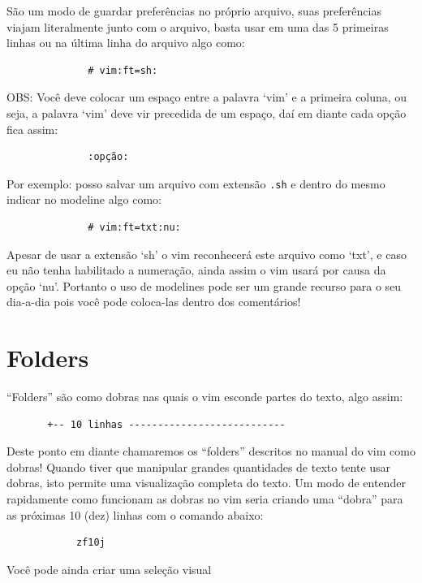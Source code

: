 \documentclass[10pt,a4paper,openany]{book}
\begin{document}
São um modo de guardar preferências no próprio arquivo, suas
preferências viajam literalmente junto com o arquivo, basta usar em
uma das 5 primeiras linhas ou na última linha do arquivo algo
como:

\begin{verbatim}
			  # vim:ft=sh:
\end{verbatim}

OBS: Você deve colocar um espaço entre a palavra `vim' e a primeira
coluna, ou seja, a palavra `vim' deve vir precedida de um espaço, daí
em diante cada opção fica assim:

\begin{verbatim}
			  :opção:
\end{verbatim}

Por exemplo: posso salvar um arquivo com extensão \verb|.sh| e dentro do
mesmo indicar no modeline algo como:

\begin{verbatim}
			  # vim:ft=txt:nu:
\end{verbatim}

Apesar de usar a extensão `sh' o vim reconhecerá este arquivo como `txt', e
caso eu não tenha habilitado a numeração, ainda assim o vim usará por causa da
opção `nu'.  Portanto o uso de modelines  pode ser um grande recurso para o seu
dia-a-dia pois você pode coloca-las dentro dos comentários!


\chapter{Folders}\label{cha:Folders}
``Folders'' são como dobras nas quais o vim esconde partes do texto,
algo assim:

\begin{verbatim}
	   +-- 10 linhas ---------------------------
\end{verbatim}

Deste ponto em diante chamaremos os ``folders'' descritos no manual do
vim como dobras!  Quando tiver que manipular grandes quantidades de
texto tente usar dobras, isto permite uma visualização completa do
texto.  Um modo de entender rapidamente como funcionam as dobras no
vim seria criando uma ``dobra'' para as próximas 10 (dez) linhas com o
comando abaixo:

\begin{verbatim}
			zf10j
\end{verbatim}

Você pode ainda criar uma seleção visual
\end{document}
